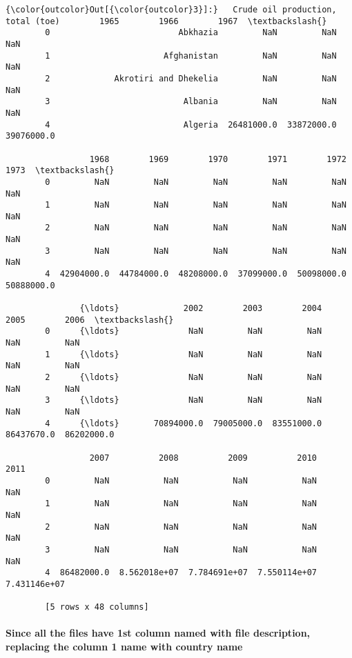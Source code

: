 \documentclass[11pt]{article}
\begin{document}
\begin{Verbatim}[commandchars=\\\{\}]
{\color{outcolor}Out[{\color{outcolor}3}]:}   Crude oil production, total (toe)        1965        1966        1967  \textbackslash{}
        0                          Abkhazia         NaN         NaN         NaN   
        1                       Afghanistan         NaN         NaN         NaN   
        2             Akrotiri and Dhekelia         NaN         NaN         NaN   
        3                           Albania         NaN         NaN         NaN   
        4                           Algeria  26481000.0  33872000.0  39076000.0   
        
                 1968        1969        1970        1971        1972        1973  \textbackslash{}
        0         NaN         NaN         NaN         NaN         NaN         NaN   
        1         NaN         NaN         NaN         NaN         NaN         NaN   
        2         NaN         NaN         NaN         NaN         NaN         NaN   
        3         NaN         NaN         NaN         NaN         NaN         NaN   
        4  42904000.0  44784000.0  48208000.0  37099000.0  50098000.0  50888000.0   
        
               {\ldots}             2002        2003        2004        2005        2006  \textbackslash{}
        0      {\ldots}              NaN         NaN         NaN         NaN         NaN   
        1      {\ldots}              NaN         NaN         NaN         NaN         NaN   
        2      {\ldots}              NaN         NaN         NaN         NaN         NaN   
        3      {\ldots}              NaN         NaN         NaN         NaN         NaN   
        4      {\ldots}       70894000.0  79005000.0  83551000.0  86437670.0  86202000.0   
        
                 2007          2008          2009          2010          2011  
        0         NaN           NaN           NaN           NaN           NaN  
        1         NaN           NaN           NaN           NaN           NaN  
        2         NaN           NaN           NaN           NaN           NaN  
        3         NaN           NaN           NaN           NaN           NaN  
        4  86482000.0  8.562018e+07  7.784691e+07  7.550114e+07  7.431146e+07  
        
        [5 rows x 48 columns]
\end{Verbatim}
            
    \paragraph{Since all the files have 1st column named with file
description, replacing the column 1 name with country
name}\label{since-all-the-files-have-1st-column-named-with-file-description-replacing-the-column-1-name-with-country-name}
\end{document}
